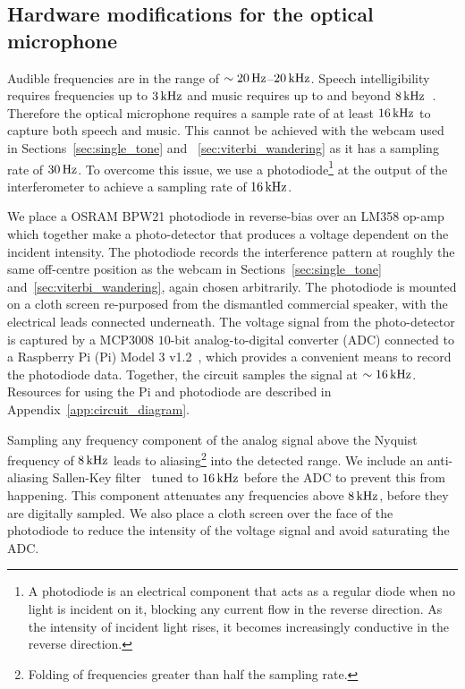 \documentclass[paper-main.tex]{subfiles}
\begin{document}
\subsection{Hardware modifications for the optical microphone}
\label{sec:photodiode}


Audible frequencies are in the range of $\sim 20\,{\rm Hz}$--$20\,{\rm kHz}$. Speech intelligibility requires frequencies up to $3\,{\rm kHz}$ and music requires up to and beyond $8\,{\rm kHz}$~\cite{speech_intelligibility}. Therefore the optical microphone requires a sample rate of at least $16\,{\rm kHz}$ to capture both speech and music. This cannot be achieved with the webcam used in Sections~\ref{sec:single_tone} and ~\ref{sec:viterbi_wandering} as it has a sampling rate of $30\,{\rm Hz}$.
To overcome this issue, we use a photodiode\footnote{A photodiode is an electrical component that acts as a regular diode when no light is incident on it, blocking any current flow in the reverse direction. As the intensity of incident light rises, it becomes increasingly conductive in the reverse direction.} at the output of the interferometer to achieve a sampling rate of $16\,{\rm kHz}$.

We place a OSRAM BPW21 photodiode in reverse-bias over an LM358 op-amp which together make a photo-detector that produces a voltage dependent on the incident intensity. 
The photodiode records the interference pattern at roughly the same off-centre position as the webcam in Sections~\ref{sec:single_tone} and~\ref{sec:viterbi_wandering}, again chosen arbitrarily.
The photodiode is mounted on a cloth screen re-purposed from the dismantled commercial speaker, with the electrical leads connected underneath. 
The voltage signal from the photo-detector is captured by a MCP3008 $10$-bit analog-to-digital converter (ADC) connected to a Raspberry Pi (Pi) Model 3 v1.2~\cite{RaspberryPi:online}, which provides a convenient means to record the photodiode data.
Together, the circuit samples the signal at $\sim 16\,{\rm kHz}$. Resources for using the Pi and photodiode are described in Appendix~\ref{app:circuit_diagram}.

Sampling any frequency component of the analog signal above the Nyquist frequency of $8\,{\rm kHz}$ leads to aliasing\footnote{Folding of frequencies greater than half the sampling rate.} into the detected range. We include an anti-aliasing Sallen-Key filter~\cite{sallen_key_filter} tuned to $16\,{\rm kHz}$ before the ADC to prevent this from happening.
This component attenuates any frequencies above $8\,{\rm kHz}$, before they are digitally sampled. We also place a cloth screen over the face of the photodiode to reduce the intensity of the voltage signal and avoid saturating the ADC.
\end{document}
